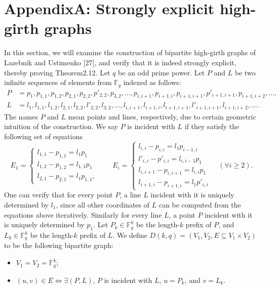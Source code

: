 \documentclass[10pt,a4paper]{article}
\begin{document}
\section*{AppendixA: Strongly explicit high-girth graphs}
In this section, we will examine the construction of bipartite high-girth graphs of Lazebnik and Ustimenko [27], and verify that it is indeed strongly explicit, thereby proving Theorem2.12.
Let $q$ be an odd prime power. Let $P$ and $L$ be two infinite sequences of elements from $\mathbb F_q$ indexed as follows:
\begin{align*}
P&=p_1,p_{1,1},p_{1,2},p_{2,1},p_{2,2},p'_{2,2},p_{3,2},\ldots,p_{i,i+1},p_{i+1,i},p_{i+1,i+1},p'_{i+1,i+1},p_{i+1,i+2},\ldots,\\
L&=l_1,l_{1,1},l_{1,2},l_{2,1},l_{2,2},l'_{2,2},l_{3,2},\ldots,l_{i,i+1},l_{i+1,i},l_{i+1,i+1},l'_{i+1,i+1},l_{i+1,i+2},\ldots.
\end{align*}
The names $P$ and $L$ mean points and lines, respectively, due to certain geometric intuition of the construction. We say $P$ is incident with $L$ if they satisfy the following set of equations
\begin{equation}\tag{3}
E_1=\begin{cases}l_{1,1}-p_{1,1}=l_1p_1\\l_{1,2}-p_{1,2}=l_{1,1}p_1\\l_{2,1}-p_{2,1}=l_1p_{1,1},\end{cases}\qquad
E_i=\begin{cases}l_{i,i}-p_{i,i}=l_1p_{i-1,i}\\l'_{i,i}-p'_{i,i}=l_{i,i-1}p_1\\l_{i,i+1}-p_{i,i+1}=l_{i,i}p_1\\l_{i+1,i}-p_{i+1,i}=l_1p'_{i,i}\end{cases}\quad(\forall i\ge2).
\end{equation}
One can verify that for every point $P$, a line $L$ incident with it is uniquely determined by $l_1$, since all other coordinates of $L$ can be computed from the equations above iteratively. Similarly for every line $L$, a point $P$ incident with it is uniquely determined by $p_1$.
Let $P_k\in\mathbb F_q^k$ be the length-$k$ prefix of $P$, and $L_k\in\mathbb F_q^k$ be the length-$k$ prefix of $L$. We define $D(k,q)=(V_1,V_2,E\subseteq V_1\times V_2)$ to be the following bipartite graph:
\begin{itemize}
\item $V_1=V_2=\mathbb F_q^k$;
\item $(u,v)\in E\Longleftrightarrow\exists(P,L)$, $P$ is incident with $L$, $u=P_k$, and $v=L_k$.
\end{itemize}
\end{document}
